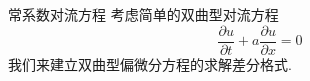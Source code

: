 \documentclass[xcolor=svgnames]{beamer} %
\begin{document}
\begin{frame}{常系数对流方程}
 考虑简单的双曲型对流方程
\begin{equation}\label{eq:04_dl_o}
 \dfrac{\partial u}{\partial t}+a\dfrac{\partial u}{\partial x}=0
\end{equation}
我们来建立双曲型偏微分方程的求解差分格式.\par
\end{frame}
\end{document}

